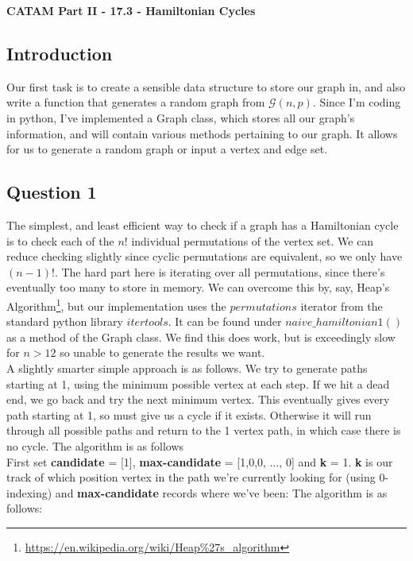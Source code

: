 \documentclass[10pt,a4paper]{report}
\begin{document}
\textbf{CATAM Part II - 17.3 - Hamiltonian Cycles}


\subsection*{Introduction}

Our first task is to create a sensible data structure to store our graph in, and also write a function that generates a random graph from $\mathcal{G}(n,p)$. Since I'm coding in python, I've implemented a Graph class, which stores all our graph's information, and will contain various methods pertaining to our graph. It allows for us to generate a random graph or input a vertex and edge set.

\subsection*{Question 1}	

The simplest, and least efficient way to check if a graph has a Hamiltonian cycle is to check each of the $n!$ individual permutations of the vertex set. We can reduce checking slightly since cyclic permutations are equivalent, so we only have $(n-1)!$. The hard part here is iterating over all permutations, since there's eventually too many to store in memory. We can overcome this by, say, Heap's Algorithm\footnote{\url{https://en.wikipedia.org/wiki/Heap\%27s_algorithm}}, but our implementation uses the $permutations$ iterator from the standard python library $itertools$.  It can be found under $naive\_hamiltonian1()$ as a method of the Graph class. We find this does work, but is exceedingly slow for $n>12$ so unable to generate the results we want. \\

A slightly smarter simple approach is as follows. We try to generate paths starting at 1, using the minimum possible vertex at each step. If we hit a dead end, we go back and try the next minimum vertex. This eventually gives every path starting at 1, so must give us a cycle if it exists. Otherwise it will run through all possible paths and return to the 1 vertex path, in which case there is no cycle. The algorithm is as follows\\
 
First set \textbf{candidate} = [1], \textbf{max-candidate} = [1,0,0, $\dots$, 0] and \textbf{k} = 1. \textbf{k} is our track of which position vertex in the path we're currently looking for (using 0-indexing) and \textbf{max-candidate} records where we've been: The algorithm is as follows: \\
\end{document}
